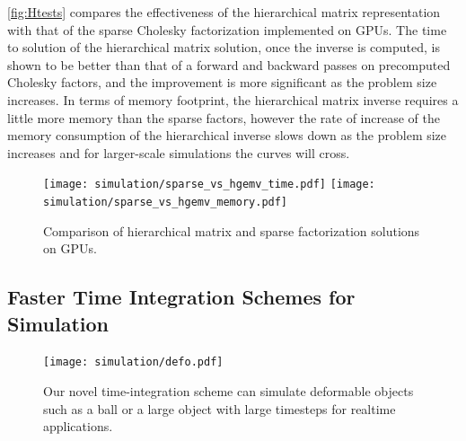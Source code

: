 
\autoref{fig:Htests} compares the effectiveness of the hierarchical matrix representation with that of the sparse Cholesky factorization implemented on GPUs. The time to solution of the hierarchical matrix solution, once the inverse is computed, is shown to be better than that of a forward and backward passes on precomputed Cholesky factors, and the improvement is more significant as the problem size increases. In terms of memory footprint, the hierarchical matrix inverse requires a little more memory than the sparse factors, however the rate of increase of the memory consumption of the hierarchical inverse slows down as the problem size increases and for larger-scale simulations the curves will cross. 

\begin{figure}
  \centering%
  \texttt{[image: simulation/sparse\_vs\_hgemv\_time.pdf]}	
  \hfill%
  \texttt{[image: simulation/sparse\_vs\_hgemv\_memory.pdf]}
  \caption{Comparison of hierarchical matrix and sparse factorization solutions on GPUs.}
  \label{fig:Htests}
\end{figure}


\subsection{Faster Time Integration Schemes for Simulation}
\begin{figure}[ht]
  \centering
  \texttt{[image: simulation/defo.pdf]}
  \caption{Our novel time-integration scheme  can simulate deformable objects such as a ball or a large object with large timesteps for realtime applications.}\label{fig:pbdd}
\end{figure}

